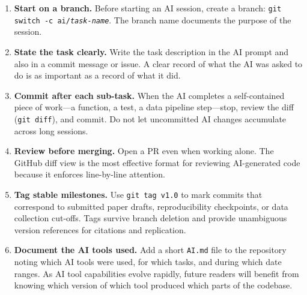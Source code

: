 \begin{enumerate}
  \item \textbf{Start on a branch.}  Before starting an AI session, create a
        branch: \texttt{git switch -c ai/\textit{task-name}}.  The branch name
        documents the purpose of the session.

  \item \textbf{State the task clearly.}  Write the task description in the
        AI prompt and also in a commit message or issue.  A clear record of
        what the AI was asked to do is as important as a record of what it did.

  \item \textbf{Commit after each sub-task.}  When the AI completes a
        self-contained piece of work---a function, a test, a data pipeline
        step---stop, review the diff (\texttt{git diff}), and commit.
        Do not let uncommitted AI changes accumulate across long sessions.

  \item \textbf{Review before merging.}  Open a PR even when working alone.
        The GitHub diff view is the most effective format for reviewing AI-generated
        code because it enforces line-by-line attention.

  \item \textbf{Tag stable milestones.}  Use \texttt{git tag v1.0} to mark
        commits that correspond to submitted paper drafts, reproducibility
        checkpoints, or data collection cut-offs.  Tags survive branch deletion
        and provide unambiguous version references for citations and replication.

  \item \textbf{Document the AI tools used.}  Add a short \texttt{AI.md} file
        to the repository noting which AI tools were used, for which tasks, and
        during which date ranges.  As AI tool capabilities evolve rapidly,
        future readers will benefit from knowing which version of which tool
        produced which parts of the codebase.
\end{enumerate}
